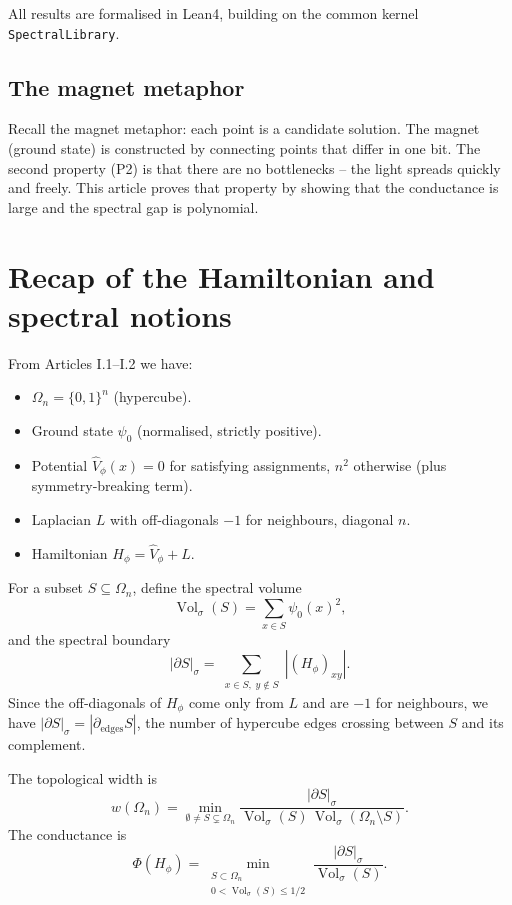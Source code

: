 \documentclass[11pt,a4paper]{article}
\begin{document}
All results are formalised in Lean4, building on the common kernel \texttt{SpectralLibrary}.

\subsection{The magnet metaphor}

Recall the magnet metaphor: each point is a candidate solution. The magnet (ground state) is constructed by connecting points that differ in one bit. The second property (P2) is that there are no bottlenecks – the light spreads quickly and freely. This article proves that property by showing that the conductance is large and the spectral gap is polynomial.

\section{Recap of the Hamiltonian and spectral notions}

From Articles I.1–I.2 we have:
\begin{itemize}
\item $\Omega_n = \{0,1\}^n$ (hypercube).
\item Ground state $\psi_0$ (normalised, strictly positive).
\item Potential $\hat{V}_\phi(x)=0$ for satisfying assignments, $n^2$ otherwise (plus symmetry‑breaking term).
\item Laplacian $L$ with off‑diagonals $-1$ for neighbours, diagonal $n$.
\item Hamiltonian $H_\phi = \hat{V}_\phi + L$.
\end{itemize}

For a subset $S\subseteq\Omega_n$, define the spectral volume
\[
\operatorname{Vol}_\sigma(S) = \sum_{x\in S} \psi_0(x)^2,
\]
and the spectral boundary
\[
|\partial S|_\sigma = \sum_{\substack{x\in S,\;y\notin S}} |(H_\phi)_{xy}|.
\]
Since the off‑diagonals of $H_\phi$ come only from $L$ and are $-1$ for neighbours, we have $|\partial S|_\sigma = |\partial_{\mathrm{edges}} S|$, the number of hypercube edges crossing between $S$ and its complement.

The topological width is
\[
w(\Omega_n) = \min_{\emptyset\neq S\subsetneq\Omega_n} \frac{|\partial S|_\sigma}{\operatorname{Vol}_\sigma(S)\,\operatorname{Vol}_\sigma(\Omega_n\setminus S)}.
\]
The conductance is
\[
\Phi(H_\phi) = \min_{\substack{S\subset\Omega_n\\0<\operatorname{Vol}_\sigma(S)\le 1/2}} \frac{|\partial S|_\sigma}{\operatorname{Vol}_\sigma(S)}.
\]
\end{document}
